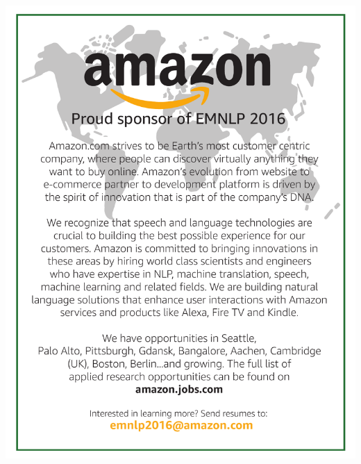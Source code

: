 \thispagestyle{empty}
\begin{center}
\vfill{}
\includegraphics[width=1\textwidth]{content/ads/Amazon-EMNLPad.pdf}
\par\end{center}


\markboth{}{} %
\markright{}{} %
\thispagestyle{empty}
\begin{center}
\vfill{}
\vfill{}
\par\end{center}


